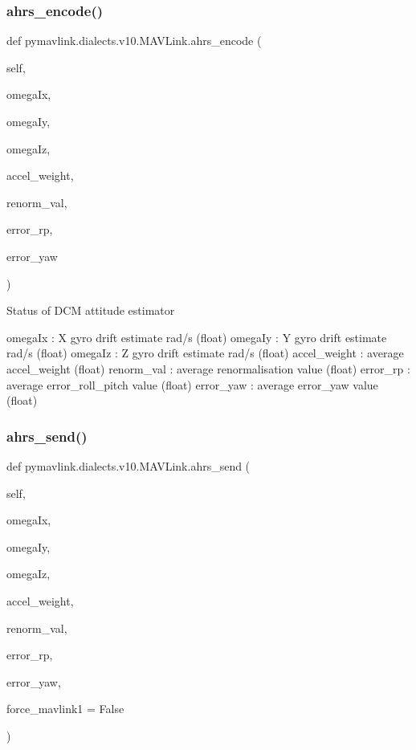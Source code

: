 \subsubsection{\texorpdfstring{ahrs\+\_\+encode()}{ahrs\_encode()}}
{\footnotesize\ttfamily def pymavlink.\+dialects.\+v10.\+M\+A\+V\+Link.\+ahrs\+\_\+encode (\begin{DoxyParamCaption}\item[{}]{self,  }\item[{}]{omega\+Ix,  }\item[{}]{omega\+Iy,  }\item[{}]{omega\+Iz,  }\item[{}]{accel\+\_\+weight,  }\item[{}]{renorm\+\_\+val,  }\item[{}]{error\+\_\+rp,  }\item[{}]{error\+\_\+yaw }\end{DoxyParamCaption})}

\begin{DoxyVerb}Status of DCM attitude estimator

omegaIx                   : X gyro drift estimate rad/s (float)
omegaIy                   : Y gyro drift estimate rad/s (float)
omegaIz                   : Z gyro drift estimate rad/s (float)
accel_weight              : average accel_weight (float)
renorm_val                : average renormalisation value (float)
error_rp                  : average error_roll_pitch value (float)
error_yaw                 : average error_yaw value (float)\end{DoxyVerb}
 \mbox{\label{classpymavlink_1_1dialects_1_1v10_1_1MAVLink_afdaf928d289a07098f7671d79c9b09c6}} 
\subsubsection{\texorpdfstring{ahrs\+\_\+send()}{ahrs\_send()}}
{\footnotesize\ttfamily def pymavlink.\+dialects.\+v10.\+M\+A\+V\+Link.\+ahrs\+\_\+send (\begin{DoxyParamCaption}\item[{}]{self,  }\item[{}]{omega\+Ix,  }\item[{}]{omega\+Iy,  }\item[{}]{omega\+Iz,  }\item[{}]{accel\+\_\+weight,  }\item[{}]{renorm\+\_\+val,  }\item[{}]{error\+\_\+rp,  }\item[{}]{error\+\_\+yaw,  }\item[{}]{force\+\_\+mavlink1 = {\ttfamily False} }\end{DoxyParamCaption})}

